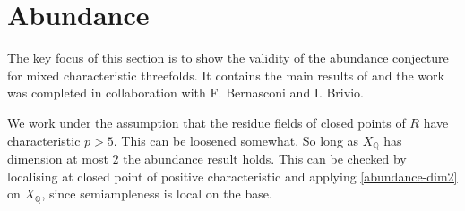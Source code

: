 %
%
%
%
%
%
%
%
%
%
%
%

	\chapter{Abundance}\label{abundance-sect}
	
	The key focus of this section is to show the validity of the abundance conjecture for mixed characteristic threefolds. It contains the main results of \cite{bernasconi2021abundance} and the work was completed in collaboration with F. Bernasconi and I. Brivio. 
	
	We work under the assumption that the residue fields of closed points of $R$ have characteristic $p>5$. This can be loosened somewhat. So long as $X_{\mathbb{Q}}$ has dimension at most $2$ the abundance result holds. This can be checked by localising at closed point of positive characteristic and applying \autoref{abundance-dim2} on $X_{\mathbb{Q}}$, since semiampleness is local on the base.
	
